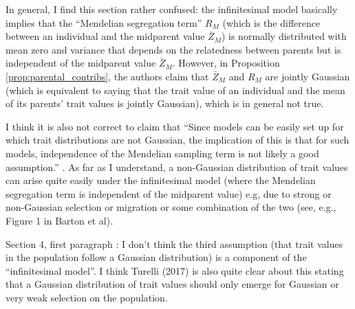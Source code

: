\begin{point}{}
    In general, I find this section rather confused: the infinitesimal model basically implies that the ``Mendelian segregation term'' $R_{M}$ (which is the difference between an individual and the midparent value $\bar{Z}_{M}$) is normally distributed with mean zero and variance that depends on the relatedness between parents but is independent of the midparent value $\bar{Z}_{M}$. However, in Proposition \ref{prop:parental_contribs}, the authors claim that $\bar{Z}_{M}$ and $R_{M}$ are jointly Gaussian (which is equivalent to saying that the trait value of an individual and the mean of its parents' trait values is jointly Gaussian), which is in general not true.
\end{point}


\begin{point}{}
    I think it is also not correct to claim that ``Since models can be easily set up for which trait distributions are not Gaussian, the implication of this is that for such models, independence of the Mendelian sampling term is not likely a good assumption.'' \revref. As far as I understand, a non-Gaussian distribution of trait values can arise quite easily under the infinitesimal model (where the Mendelian segregation term is independent of the midparent value) e.g, due to strong or non-Gaussian selection or migration or some combination of the two (see, e.g., Figure 1 in Barton et al).
\end{point}


\begin{point}{}
    Section 4, first paragraph \revref: I don't think the third assumption (that trait values in the population follow a Gaussian distribution) is a component of the ``infinitesimal model''. I think Turelli (2017) is also quite clear about this stating that a Gaussian distribution of trait values should only emerge for Gaussian or very weak selection on the population.
\end{point}

